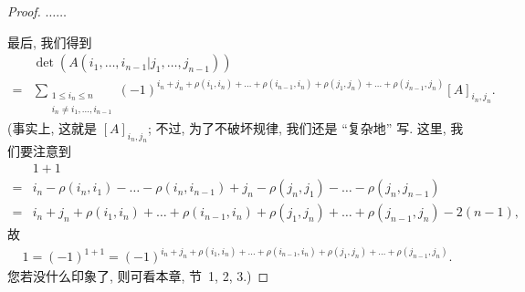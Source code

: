 \documentclass[%
    UTF8,%
    fontset=none,%
    punct=kaiming,%
    zihao=-4,%
    a4paper,%
    oneside,%
]{ctexbook}
\renewcommand*{\leq}{\leqslant}
\begin{document}
\begin{proof}
    \(\dots \dots\)

    最后, 我们得到
    \begin{align*}
             &
        \det {(A({i_1,\dots,i_{n-1}}|{j_1,\dots,j_{n-1}}))}
        \\
        = {} &
        \sum_{\substack{
        1 \leq i_n \leq n \\
                i_n \neq i_1, \dots, i_{n-1}
            }}
        {(-1)^{i_n + j_n
                    + \rho(i_1, i_n) + \dots + \rho(i_{n-1}, i_n)
                    + \rho(j_1, j_n) + \dots + \rho(j_{n-1}, j_n)}
                [A]_{i_n,j_n}}.
    \end{align*}
    (事实上, 这就是 \([A]_{i_n,j_n}\);
    不过, 为了不破坏规律,
    我们还是 ``复杂地'' 写.
    这里, 我们要注意到
    \begin{align*}
             & 1 + 1
        \\
        = {} &
        i_n - \rho(i_n, i_1) - \dots - \rho(i_n, i_{n-1})
        + j_n - \rho(j_n, j_1) - \dots - \rho(j_n, j_{n-1})
        \\
        = {} &
        i_n + j_n
        + \rho(i_1, i_n) + \dots + \rho(i_{n-1}, i_n)
        + \rho(j_1, j_n) + \dots + \rho(j_{n-1}, j_n)
        - 2(n-1),
    \end{align*}
    故
    \begin{align*}
        1 = (-1)^{1+1}
        = (-1)^{i_n + j_n
                + \rho(i_1, i_n) + \dots + \rho(i_{n-1}, i_n)
                + \rho(j_1, j_n) + \dots + \rho(j_{n-1}, j_n)}.
    \end{align*}
    您若没什么印象了, 则可看本章, 节~1, 2, 3.)


\end{proof}
\end{document}
